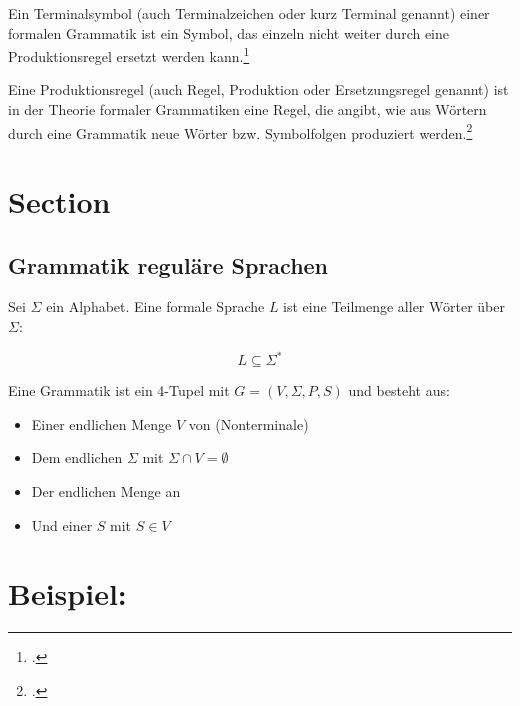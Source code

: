 \documentclass{lehramt-informatik-haupt}
\begin{document}
%

Ein Terminalsymbol (auch Terminalzeichen oder kurz Terminal genannt)
einer formalen Grammatik ist ein Symbol, das einzeln nicht weiter durch
eine Produktionsregel ersetzt werden kann.\footcite{wiki:terminal}

Eine Produktionsregel (auch Regel, Produktion oder Ersetzungsregel
genannt) ist in der Theorie formaler Grammatiken eine Regel, die angibt,
wie aus Wörtern durch eine Grammatik neue Wörter bzw. Symbolfolgen
produziert werden.\footcite{wiki:produktionsregel}

\section{Section}

\subsection{Grammatik reguläre Sprachen}

Sei $\Sigma$ ein Alphabet. Eine formale Sprache $L$ ist eine Teilmenge
aller Wörter über $\Sigma$:

\begin{displaymath}
L \subseteq \Sigma^*
\end{displaymath}

\bigskip

\noindent
Eine Grammatik ist ein 4-Tupel mit $G = (V, \Sigma, P, S)$ und besteht aus:

\begin{itemize}
\item Einer endlichen Menge $V$ von  (Nonterminale)

\item Dem endlichen  $\Sigma$ mit $\Sigma \cap V
= \emptyset$

\item Der endlichen Menge an 

\item Und einer  $S$ mit $S \in V$
\end{itemize}

%

\section{Beispiel:}
\end{document}
